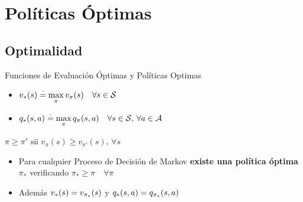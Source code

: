 \documentclass[10pt, envcountsect, handout, aspectratio=1610, hyperref={hypertexnames=true}]{beamer}
\begin{document}
\section{Políticas Óptimas}


\subsection{Optimalidad}

\begin{frame}{Funciones de Evaluación Óptimas y Políticas Optimas}

\begin{definition}
\begin{itemize}
    \item {}
    
    	\centerline{$\displaystyle v_*(s) \stackrel{\cdot}{=} \max_\pi v_\pi(s) \quad \forall s \in {\cal S}$}
    
    \item {}
    
		\centerline{$\displaystyle q_*(s,a) \stackrel{\cdot}{=} \max_\pi q_\pi(s,a)  \quad \forall s \in {\cal S}, \, \forall a \in \cal{A}$}
\end{itemize}


\begin{definition}
\centerline{$ \pi \geq \pi' \text{ sii } v_\pi(s) \geq v_{\pi'}(s), \, \forall s $}
\end{definition}

\begin{theorem}[\textcolor{reddark}{Existencia de la Política Óptima}]
\begin{itemize}
\item  Para cualquier Proceso de Decisión de Markov \textbf{existe una política óptima} $\pi_*$ 
		verificando $\pi_*\geq \pi \quad \forall \pi$
\item Además $\displaystyle v_*(s) = v_{\pi_*}(s)$ y $\displaystyle q_*(s,a) = q_{\pi_*}(s,a)$
\end{itemize}
\end{theorem}


\end{definition}

\end{frame}
\end{document}
